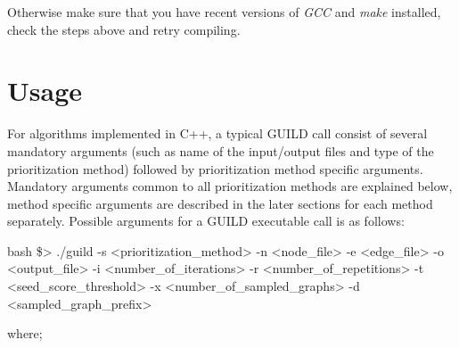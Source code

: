 \documentclass[11pt,twoside]{article}
\newcommand{\printcommand}[1]{\colorbox{code}{\scriptsize{\BUseVerbatim{#1}}}}
\begin{document}
\vspace{5 mm}
Otherwise make sure that you have recent versions of \textit{GCC} and 
\textit{make} installed, %
check the steps above and retry compiling.


\section{Usage}

For algorithms implemented in C++, a typical GUILD call consist of several 
mandatory arguments (such as name of the input/output files and type of the 
prioritization method) followed by prioritization method specific arguments. 
Mandatory arguments common to all prioritization methods are explained below, 
method specific arguments are described in the later sections for each method 
separately. Possible arguments for a GUILD executable call is as follows:

\begin{SaveVerbatim}{bash}
\$> ./guild -s <prioritization_method> -n <node_file> -e <edge_file> -o <output_file> 
	    -i <number_of_iterations> -r <number_of_repetitions> -t <seed_score_threshold> 
	    -x <number_of_sampled_graphs> -d <sampled_graph_prefix>
\end{SaveVerbatim}
\printcommand{bash}

\vspace{5 mm}
where;
\end{document}
